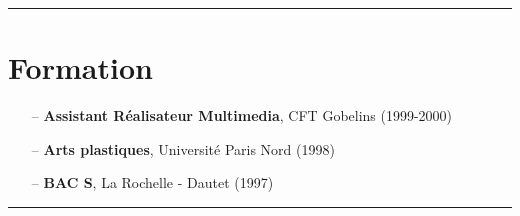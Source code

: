 \documentclass[a4paper,11pt]{article}
\newcommand{\breakvspace}[1]{\pagebreak[2]\vspace{#1}\pagebreak[2]}
\newcommand{\nobreakvspace}[1]{\nopagebreak[4]\vspace{#1}\nopagebreak[4]}
\newcommand{\spacedhrule}[2]{\breakvspace{#1}\hrule\nobreakvspace{#2}}
\begin{document}
\spacedhrule{0.5em}{-0.4em}

\section*{Formation}

\begin{itemize}
  \item[--] \textbf{Assistant Réalisateur Multimedia}, CFT Gobelins (1999-2000)
  \item[--] \textbf{Arts plastiques}, Université Paris Nord (1998)
  \item[--] \textbf{BAC S}, La Rochelle - Dautet (1997)
\end{itemize}

\spacedhrule{0.5em}{-0.4em}
\end{document}
